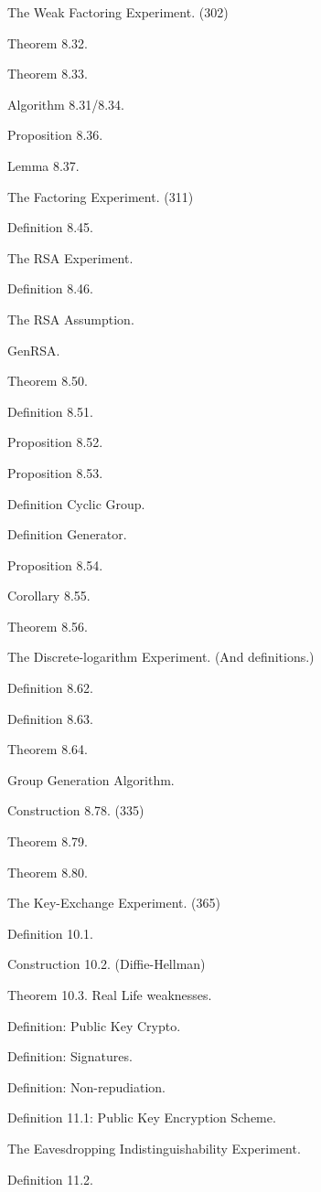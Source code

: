 \documentclass[10pt]{article}
\begin{document}
\begin{multicols}{2}

The Weak Factoring Experiment. (302)

Theorem 8.32.

Theorem 8.33.

Algorithm 8.31/8.34.

Proposition 8.36.

Lemma 8.37.

The Factoring Experiment. (311)

Definition 8.45.

The RSA Experiment.

Definition 8.46.

The RSA Assumption.

GenRSA.

Theorem 8.50.

Definition 8.51.

Proposition 8.52.

Proposition 8.53.

Definition Cyclic Group.

Definition Generator.

Proposition 8.54.

Corollary 8.55.

Theorem 8.56.

The Discrete-logarithm Experiment. (And definitions.)

Definition 8.62.

Definition 8.63.

Theorem 8.64.

Group Generation Algorithm.

Construction 8.78. (335)

Theorem 8.79.

Theorem 8.80.

The Key-Exchange Experiment. (365)

Definition 10.1.

Construction 10.2. (Diffie-Hellman)

Theorem 10.3. Real Life weaknesses.

Definition: Public Key Crypto.

Definition: Signatures.

Definition: Non-repudiation.

Definition 11.1: Public Key Encryption Scheme.

The Eavesdropping Indistinguishability Experiment.

Definition 11.2.


\end{multicols}
\end{document}
